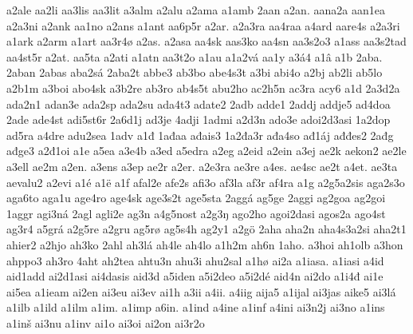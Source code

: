 {    a2ale
    aa2li
    aa3lis
    aa3lit
    a3alm
    a2alu
    a2ama
    a1amb
    2aan
    a2an.
    aana2a
    aan1ea
    a2a3ni
    a2ank
    aa1no
    a2ans
    a1ant
    aa6p5r
    a2ar.
    a2a3ra
    aa4raa
    a4ard
    aare4s
    a2a3ri
    a1ark
    a2arm
    a1art
    aa3r4ø
    a2as.
    a2asa
    aa4sk
    aas3ko
    aa4sn
    aa3s2o3
    a1ass
    aa3s2tad
    aa4st5r
    a2at.
    aa5ta
    a2ati
    a1atn
    aa3t2o
    a1au
    a1a2vá
    aa1y
    a3á4
    a1â
    a1b
    2aba.
    2aban
    2abas
    aba2sá
    2aba2t
    abbe3
    ab3bo
    abe4s3t
    a3bi
    abi4o
    a2bj
    ab2li
    ab5lo
    a2b1m
    a3boi
    abo4sk
    a3b2re
    ab3ro
    ab4s5t
    abu2ho
    ac2h5n
    ac3ra
    acy6
    a1d
    2a3d2a
    ada2n1
    adan3e
    ada2sp
    ada2su
    ada4t3
    adate2
    2adb
    adde1
    2addj
    addje5
    ad4doa
    2ade
    ade4st
    adi5st6r
    2a6d1j
    ad3je
    4adji
    1admi
    a2d3n
    ado3e
    adoi2d3asi
    1a2dop
    ad5ra
    a4dre
    adu2sea
    1adv
    a1đ
    1ađaa
    ađais3
    1a2đa3r
    ađa4so
    ađ1áj
    ađđes2
    2ađg
    ađge3
    a2đ1oi
    a1e
    a5ea
    a3e4b
    a3ed
    a5edra
    a2eg
    a2eid
    a2ein
    a3ej
    ae2k
    aekon2
    ae2le
    a3ell
    ae2m
    a2en.
    a3ens
    a3ep
    ae2r
    a2er.
    a2e3ra
    ae3re
    a4es.
    ae4sc
    ae2t
    a4et.
    ae3ta
    aevalu2
    a2evi
    a1é
    a1ë
    a1f
    afal2e
    afe2s
    afi3o
    af3la
    af3r
    af4ra
    a1g
    a2g5a2sis
    aga2s3o
    aga6to
    aga1u
    age4ro
    age4sk
    age3s2t
    age5sta
    2aggá
    ag5ge
    2aggi
    ag2goa
    ag2goi
    1aggr
    agi3ná
    2agl
    agli2e
    ag3n
    a4g5nost
    a2g3ŋ
    ago2ho
    agoi2dasi
    agos2a
    ago4st
    ag3r4
    a5grá
    a2g5re
    a2gru
    ag5rø
    ag5s4h
    ag2y1
    a2gö
    2aha
    aha2n
    aha4s3a2si
    aha2t1
    ahier2
    a2hjo
    ah3ko
    2ahl
    ah3lá
    ah4le
    ah4lo
    a1h2m
    ah6n
    1aho.
    a3hoi
    ah1olb
    a3hon
    ahppo3
    ah3ro
    4aht
    ah2tea
    ahtu3n
    ahu3i
    ahu2sal
    a1hø
    ai2a
    a1iasa.
    a1iasi
    a4id
    aid1add
    ai2d1asi
    ai4dasis
    aid3d
    a5iden
    a5i2deo
    a5i2dé
    aid4n
    ai2do
    a1i4đ
    ai1e
    ai5ea
    a1ieam
    ai2en
    ai3eu
    ai3ev
    ai1h
    a3ii
    a4ii.
    a4iig
    aija5
    a1ijal
    ai3jas
    aike5
    ai3lá
    a1ilb
    a1ild
    a1ilm
    a1im.
    a1imp
    a6in.
    a1ind
    a4ine
    a1inf
    a4ini
    ai3n2j
    ai3no
    a1ins
    a1inš
    ai3nu
    a1inv
    ai1o
    ai3oi
    ai2on
    ai3r2o
}
